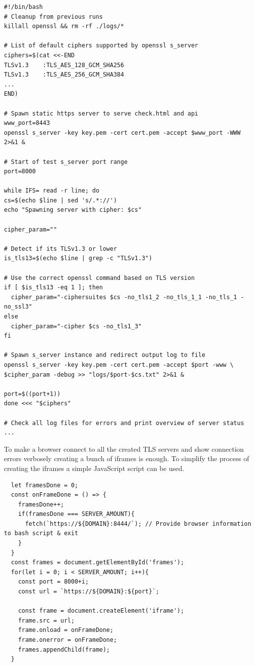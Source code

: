 \documentclass[12pt]{scrbook}
\begin{document}
\newpage

\begin{verbatim}
#!/bin/bash
# Cleanup from previous runs
killall openssl && rm -rf ./logs/*

# List of default ciphers supported by openssl s_server
ciphers=$(cat <<-END
TLSv1.3    :TLS_AES_128_GCM_SHA256
TLSv1.3    :TLS_AES_256_GCM_SHA384
...
END)

# Spawn static https server to serve check.html and api
www_port=8443
openssl s_server -key key.pem -cert cert.pem -accept $www_port -WWW 2>&1 &

# Start of test s_server port range
port=8000

while IFS= read -r line; do
cs=$(echo $line | sed 's/.*://')
echo "Spawning server with cipher: $cs"

cipher_param=""

# Detect if its TLSv1.3 or lower
is_tls13=$(echo $line | grep -c "TLSv1.3")

# Use the correct openssl command based on TLS version
if [ $is_tls13 -eq 1 ]; then
  cipher_param="-ciphersuites $cs -no_tls1_2 -no_tls_1_1 -no_tls_1 -no_ssl3"
else
  cipher_param="-cipher $cs -no_tls1_3"
fi

# Spawn s_server instance and redirect output log to file
openssl s_server -key key.pem -cert cert.pem -accept $port -www \
$cipher_param -debug >> "logs/$port-$cs.txt" 2>&1 &

port=$((port+1))
done <<< "$ciphers"

# Check all log files for errors and print overview of server status
...
\end{verbatim}

\newpage

To make a browser connect to all the created TLS servers and show connection errors verbosely creating a bunch of iframes is enough.
To simplify the process of creating the iframes a simple JavaScript script can be used.

\begin{verbatim}
  let framesDone = 0;
  const onFrameDone = () => {
    framesDone++;
    if(framesDone === SERVER_AMOUNT){
      fetch(`https://${DOMAIN}:8444/`); // Provide browser information to bash script & exit
    }
  }
  const frames = document.getElementById('frames');
  for(let i = 0; i < SERVER_AMOUNT; i++){
    const port = 8000+i;
    const url = `https://${DOMAIN}:${port}`;

    const frame = document.createElement('iframe');
    frame.src = url;
    frame.onload = onFrameDone;
    frame.onerror = onFrameDone;
    frames.appendChild(frame);
  }
\end{verbatim}
\end{document}
